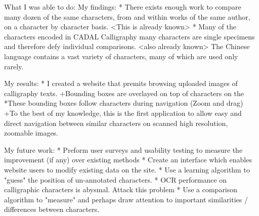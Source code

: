 What I was able to do:
    My findings:
        * There exists enough work to compare many dozen of the same characters, from and within works of the same author, on a character by character basis. <This is already known>
        *  Many of the characters encoded in CADAL Calligraphy many characters are single specimens and therefore defy individual comparisons.  <also already known>  The Chinese language contains a vast variety of characters, many of which are used only rarely.
    
    My results:
        *  I created a website that premits browsing uploaded images of calligraphy texts.
            +Bounding boxes are overlayed on top of characters on the 
                *These bounding boxes follow characters during navigation (Zoom and drag)
            +To the best of my knowledge, this is the first application to allow easy and direct navigation between similar characters on scanned high resolution, zoomable images.


    My future work:
        *  Preform user surveys and usability testing to measure the improvement (if any) over existing methods
        *  Create an interface which enables website users to modify existing data on the site.
        *  Use a learning algorithm to "guess" the position of un-annotated characters.
        *  OCR performance on calligraphic characters is abysmal.  Attack this problem
        *  Use a comparison algorithm to "measure" and perhaps draw attention to important similarities / differences between characters.




